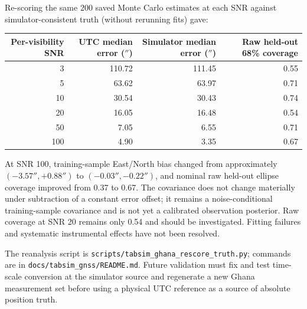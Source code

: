 \documentclass[11pt,a4paper]{article}
\begin{document}
Re-scoring the same $200$ saved Monte Carlo estimates at each SNR
against simulator-consistent truth (without rerunning fits) gave:
\begin{center}
\begin{tabular}{rrrr}
\toprule
Per-visibility SNR & UTC median error ($''$) &
 Simulator median error ($''$) & Raw held-out 68\% coverage\\
\midrule
3 & 110.72 & 111.45 & 0.55\\
5 & 63.62 & 63.97 & 0.71\\
10 & 30.54 & 30.43 & 0.74\\
20 & 16.05 & 16.48 & 0.54\\
50 & 7.05 & 6.55 & 0.71\\
100 & 4.90 & 3.35 & 0.67\\
\bottomrule
\end{tabular}
\end{center}
At SNR 100, training-sample East/North bias changed from
approximately $(-3.57'',+0.88'')$ to
$(-0.03'',-0.22'')$, and nominal raw held-out ellipse coverage
improved from 0.37 to 0.67. The covariance does not change materially
under subtraction of a constant error offset; it remains a
noise-conditional training-sample covariance and is not yet a
calibrated observation posterior. Raw coverage at SNR 20 remains
only 0.54 and should be investigated. Fitting failures and
systematic instrumental effects have not been resolved.

The reanalysis script is
\texttt{scripts/tabsim\_ghana\_rescore\_truth.py}; commands are in
\texttt{docs/tabsim\_gnss/README.md}. Future validation must fix and
test time-scale conversion at the simulator source and regenerate
a new Ghana measurement set before using a physical UTC reference
as a source of absolute position truth.
\end{document}

